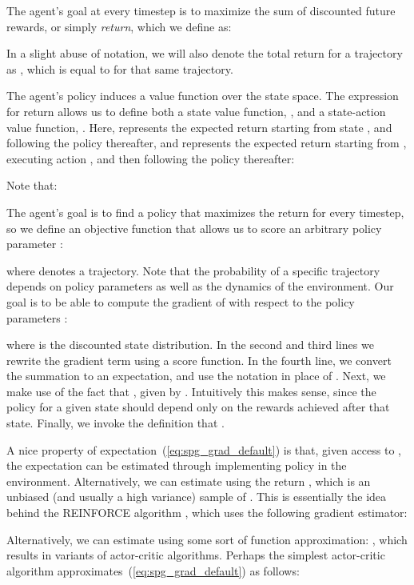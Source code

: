 \documentclass[letterpaper]{article}
\begin{document}
The agent's goal at every timestep is to maximize the sum of discounted future rewards, or simply \textit{return}, which we define as:


In a slight abuse of notation, we will also denote the total return for a trajectory  as , which is equal to  for that same trajectory.

The agent's policy induces a value function over the state space. The expression for return allows us to define both a state value function, , and a state-action value function, . Here,  represents the expected return starting from state , and following the policy  thereafter, and  represents the expected return starting from , executing action , and then following the policy  thereafter:


Note that:


The agent's goal is to find a policy that maximizes the return for every timestep, so we define an objective function  that allows us to score an arbitrary policy parameter :

where  denotes a trajectory. Note that the probability of a specific trajectory depends on policy parameters as well as the dynamics of the environment. Our goal is to be able to compute the gradient of  with respect to the policy parameters :

where  is the discounted state distribution. In the second and third lines we rewrite the gradient term using a score function. In the fourth line, we convert the summation to an expectation, and use the  notation in place of . Next, we make use of the fact that , given by \citeauthor{williams1992simple} . Intuitively this makes sense, since the policy for a given state should depend only on the rewards achieved after that state. Finally, we invoke the definition that .

A nice property of expectation~(\ref{eq:spg_grad_default}) is that, given access to , the expectation can be estimated through implementing policy  in the environment. Alternatively, we can estimate  using the return , which is an unbiased (and usually a high variance) sample of . This is essentially the idea behind the REINFORCE algorithm \cite{williams1992simple}, which uses the following gradient estimator:

Alternatively, we can estimate  using some sort of function approximation: , which results in variants of actor-critic algorithms. Perhaps the simplest actor-critic algorithm approximates~(\ref{eq:spg_grad_default}) as follows:
\end{document}

